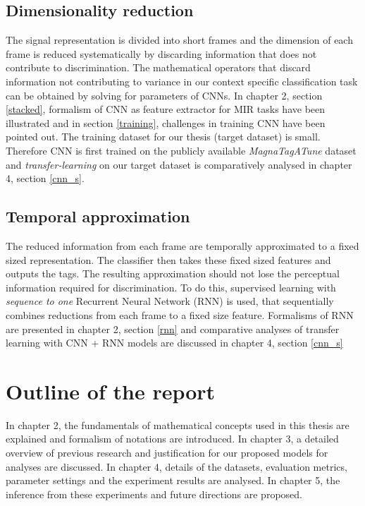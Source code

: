 \subsection{Dimensionality reduction}
The signal representation is divided into short frames and the dimension of each frame is reduced systematically by discarding information that does not contribute to discrimination. The mathematical operators that discard information not contributing to variance in our context specific classification task can be obtained by solving for parameters of CNNs. In chapter 2, section \ref{stacked}, formalism of CNN as feature extractor for MIR tasks have been illustrated and in section \ref{training}, challenges in training CNN have been pointed out. The training dataset for our thesis (target dataset) is small. Therefore CNN is first trained on the publicly available \textit{MagnaTagATune} dataset\cite{MTT} and \textit{transfer-learning} on our target dataset is comparatively analysed in chapter 4, section \ref{cnn_s}.

\subsection{Temporal approximation}
The reduced information from each frame are temporally approximated to a fixed sized representation. The classifier then takes these fixed sized features and outputs the tags. The resulting approximation should not lose the perceptual information required for discrimination. To do this, supervised learning with \textit{sequence to one} Recurrent Neural Network (RNN) is used, that sequentially combines reductions from each frame to a fixed size feature. Formalisms of RNN are presented in chapter 2, section \ref{rnn} and comparative analyses of transfer learning with CNN + RNN models are discussed in chapter 4, section \ref{cnn_s} 
  

\section{Outline of the report}
In chapter 2, the fundamentals of mathematical concepts used in this thesis are explained and formalism of notations are introduced. In chapter 3, a detailed overview of previous research and justification for our proposed models for analyses are discussed. In chapter 4, details of the datasets, evaluation metrics, parameter settings and the experiment results are analysed. In chapter 5, the inference from these experiments and future directions are proposed. 







